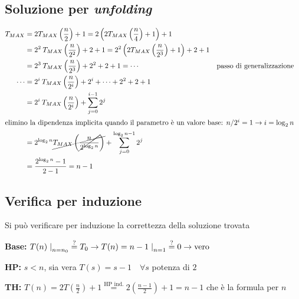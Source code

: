 \subsection{Soluzione per \textit{unfolding}}
\begin{align*}
        T_{MAX} &=
        2 T_{MAX} \left( \frac{n}{2} \right) + 1
        = 2 \left( 2 T_{MAX} \left( \frac{n}{4} \right) + 1 \right) + 1 \\
        &= 2^2 \:T_{MAX} \left( \frac{n}{2^2} \right) +2 +1
        = 2^2 \left( 2 T_{MAX} \left( \frac{n}{2^3} \right) + 1 \right) +2+1 \\
        &= 2^3 \:T_{MAX} \left( \frac{n}{2^3} \right) +2^2 +2 +1 = \cdots 
        & \text{passo di generalizzazione} & \\
        \cdots &=2^i \:T_{MAX} \left( \frac{n}{2^i} \right) +2^i + \cdots +2^2 +2 +1 \\
        &= 2^i \:T_{MAX} \left( \frac{n}{2^i} \right) + \sum_{j=0}^{i-1} 2^j \\
        \intertext{elimino la dipendenza implicita quando il parametro è un valore base: $n / 2^i=1 \rightarrow i=\log_2 n$}
        &= 2^{\log_2 n} \cancel{ T_{MAX} \left( \cancel{\frac{n}{2^{\log_2 n}} } \right) } 
        + \sum_{j=0}^{\log_2 n-1} 2^j \\
        &= \frac{2^{\log_2 n}-1}{2-1} = n-1
\end{align*}

\subsection{Verifica per induzione}
Si può verificare per induzione la correttezza della soluzione trovata 

\begin{description}
    \item{\textbf{Base:}} $T(n)\left. \right|_{n=n_0} \overset{?}{=} T_0 \rightarrow 
            T(n)=n-1 \left. \right|_{n=1} \overset{?}{=} 0 \rightarrow \text{vero}$
    \item{\textbf{HP:}} $s < n$, sia vera $T(s) = s-1 \quad \forall s $ potenza di $2$
    \item{\textbf{TH:}} $T(n) = 2T \left( \frac{n}{2} \right) +1 \overset{\text{HP ind.}}{=} 
            2 \left( \frac{n-1}{2} \right)+1 = n-1$ che è la formula per $n$
\end{description}


